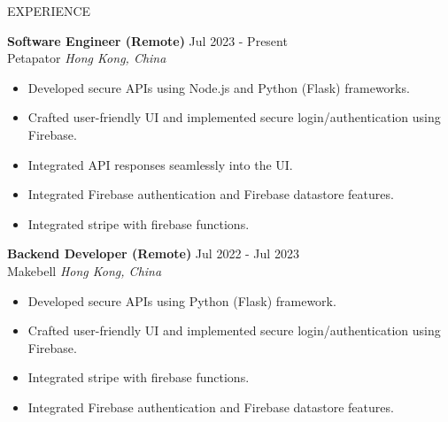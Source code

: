 \documentclass{resume}
\begin{document}
\begin{rSection}{EXPERIENCE}

\textbf{Software Engineer (Remote)} \hfill Jul 2023 - Present\\
Petapator \hfill \textit{Hong Kong, China }
 \begin{itemize}
    \itemsep -3pt {} 
     \item Developed secure APIs using Node.js and Python (Flask) frameworks.
     \item Crafted user-friendly UI and implemented secure login/authentication using Firebase.
    \item Integrated API responses seamlessly into the UI.
    \item Integrated Firebase authentication and Firebase datastore features.
    \item Integrated stripe with firebase functions.
 \end{itemize}

 \textbf{Backend Developer (Remote)} \hfill Jul 2022 - Jul 2023\\
Makebell \hfill \textit{Hong Kong, China }
 \begin{itemize}
    \itemsep -3pt {} 
     \item Developed secure APIs using Python (Flask) framework.
     \item Crafted user-friendly UI and implemented secure login/authentication using Firebase.
    \item Integrated stripe with firebase functions.
    \item Integrated Firebase authentication and Firebase datastore features.
 \end{itemize}
 
\end{rSection} 

\end{document}
